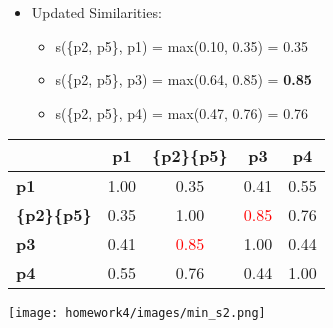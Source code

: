\documentclass[11pt]{article}
\begin{document}
\begin{enumerate}
\begin{enumerate}
\begin{itemize}
        \begin{itemize}
        \item Updated Similarities:
        \begin{itemize}
            \item s(\{p2, p5\}, p1) = max(0.10, 0.35) = 0.35
            \item s(\{p2, p5\}, p3) = max(0.64, 0.85) = \textbf{0.85}
            \item s(\{p2, p5\}, p4) = max(0.47, 0.76) = 0.76 \\
        \end{itemize}
    \end{itemize}
    
\begin{table}[H]
        \centering
        \begin{minipage}{0.7\textwidth}  %
            \centering
            \begin{minipage}{0.4\textwidth}
                \centering
                \label{tb:exp1}
                \begin{tabular}{ l| c | c | c | c}\hline
                           & \textbf{p1} & \textbf{\{p2\}}\textbf{\{p5\}}  & \textbf{p3} & \textbf{p4} \\ \hline
                    \bf p1 & 1.00        & 0.35         & 0.41        & 0.55               \\
                    \bf \{p2\}\{p5\} & 0.35        & 1.00         & \textcolor{red}{0.85}        & 0.76               \\
                    \bf p3 & 0.41        & \textcolor{red}{0.85}         & 1.00        & 0.44               \\
                    \bf p4 & 0.55        & 0.76         & 0.44        & 1.00               \\
                    \hline
                \end{tabular}
            \end{minipage}%
            \hfill
            \begin{minipage}{0.3\textwidth}
                \centering
                \texttt{[image: homework4/images/min\_s2.png]}
                \label{fig:your-image}
            \end{minipage}
        \end{minipage}
    \end{table}


\end{itemize}
\end{enumerate}
\end{enumerate}
\end{document}

